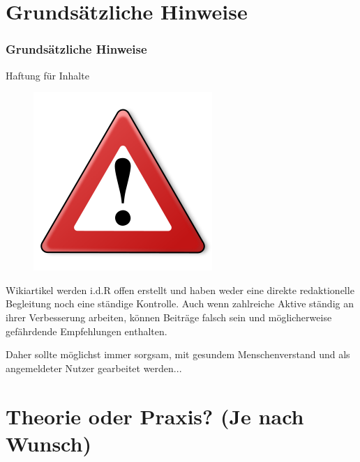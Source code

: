 \documentclass[handout]{beamer}   %
\begin{document}
\section{Grundsätzliche Hinweise}

\begin{frame}
  \frametitle{Grundsätzliche Hinweise}{Haftung für Inhalte}

  \begin{figure}
      \includegraphics[scale=0.25]{Warning_256px}
      \label{fig:Warnschild}
  \end{figure}  
 
  \begin{block}{}
    Wikiartikel werden i.d.R offen erstellt und haben weder eine direkte redaktionelle
    Begleitung noch eine ständige Kontrolle. Auch wenn zahlreiche Aktive
    ständig an ihrer Verbesserung arbeiten, können Beiträge falsch sein und
    möglicherweise gefährdende Empfehlungen enthalten.
  \end{block}
  \begin{block}{}
    Daher sollte möglichst immer sorgsam, mit gesundem
    Menschenverstand und als angemeldeter Nutzer gearbeitet werden...
  \end{block}
\end{frame}

\section{Theorie oder Praxis? (Je nach Wunsch)}
\end{document}
